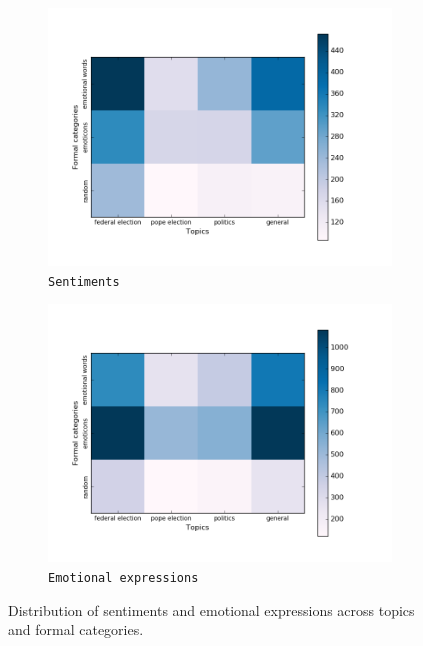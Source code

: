 \begin{figure}[htbp!]
{
\centering
\begin{subfigure}{.5\textwidth}
  \centering
  \includegraphics[width=\linewidth]{img/sentiment_stat.png}
  \caption{\texttt{Sentiments}}
\end{subfigure}%
\begin{subfigure}{.5\textwidth}
  \centering
  \includegraphics[width=\linewidth]{img/emo-expression_stat.png}
  \caption{\texttt{Emotional expressions}}
\end{subfigure}
}
\caption{Distribution of sentiments and emotional expressions across
  topics and formal categories.}\label{fig:distr}
\end{figure}

